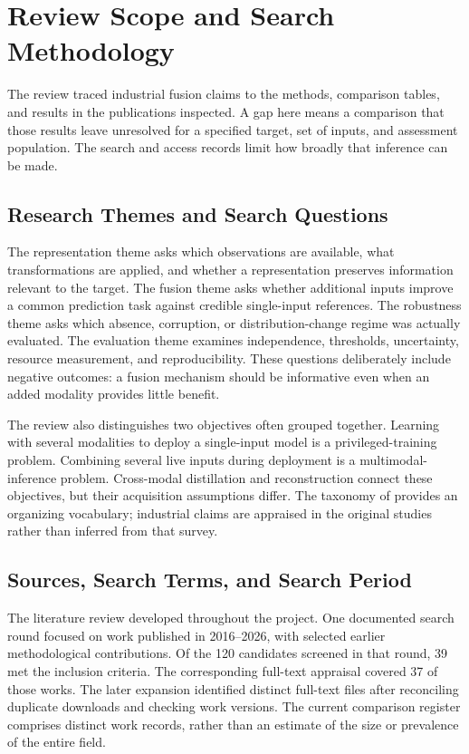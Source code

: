 \section{Review Scope and Search Methodology}

The review traced industrial fusion claims to the methods, comparison tables, and results in the publications inspected. A gap here means a comparison that those results leave unresolved for a specified target, set of inputs, and assessment population. The search and access records limit how broadly that inference can be made.

\subsection{Research Themes and Search Questions}

The representation theme asks which observations are available, what transformations are applied, and whether a representation preserves information relevant to the target. The fusion theme asks whether additional inputs improve a common prediction task against credible single-input references. The robustness theme asks which absence, corruption, or distribution-change regime was actually evaluated. The evaluation theme examines independence, thresholds, uncertainty, resource measurement, and reproducibility. These questions deliberately include negative outcomes: a fusion mechanism should be informative even when an added modality provides little benefit.

The review also distinguishes two objectives often grouped together. Learning with several modalities to deploy a single-input model is a privileged-training problem. Combining several live inputs during deployment is a multimodal-inference problem. Cross-modal distillation and reconstruction connect these objectives, but their acquisition assumptions differ. The taxonomy of \citet{Baltrusaitis2019Multimodal} provides an organizing vocabulary; industrial claims are appraised in the original studies rather than inferred from that survey.

\subsection{Sources, Search Terms, and Search Period}
The literature review developed throughout the project. One documented search round focused on work published in 2016--2026, with selected earlier methodological contributions. Of the 120 candidates screened in that round, 39 met the inclusion criteria. The corresponding full-text appraisal covered 37 of those works. The later expansion identified \ExpandedPDFCount{} distinct full-text files after reconciling duplicate downloads and checking work versions. The current comparison register comprises \ReviewWorkCount{} distinct work records, rather than an estimate of the size or prevalence of the entire field.

